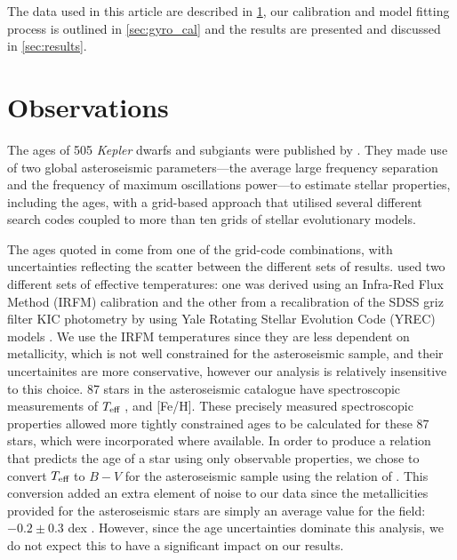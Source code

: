 \documentclass[11pt,preprint]{aastex}
\newcommand{\teff}{$T_{\rm{eff}}$}
\begin{document}
The data used in this article are described in \textsection \ref{sec:data},
our calibration and model fitting process is outlined in \textsection
\ref{sec:gyro_cal} and the results are presented and discussed in \textsection
\ref{sec:results}.

\section{Observations}
\label{sec:data}

The ages of 505 {\it Kepler} dwarfs and subgiants were published by
\citet{Chaplin2014}.
They made use of two global asteroseismic parameters---the average large
frequency separation and the frequency of maximum oscillations power---to
estimate stellar properties, including the ages, with a grid-based approach
that utilised several different search codes coupled to more than ten grids of
stellar evolutionary models.

The ages quoted in \citet{Chaplin2014} come from one of the grid-code
combinations, with uncertainties reflecting the scatter between the different
sets of results.
\citet{Chaplin2014} used two different sets of effective temperatures: one was
derived using an Infra-Red Flux Method (IRFM) calibration
\citep{Casagrande2010, SilvaAguirre2012} and the other from a recalibration of
the SDSS griz filter KIC photometry by \citet{Pinsonneault2012} using Yale
Rotating Stellar Evolution Code (YREC) models \citep{Demarque2004}.
We use the IRFM temperatures since they are less dependent on metallicity,
which is not well constrained for the asteroseismic sample, and their
uncertainites are more conservative, however our analysis is relatively
insensitive to this choice.
87 stars in the asteroseismic catalogue have spectroscopic measurements of
\teff$~$, and [Fe/H].
These precisely measured spectroscopic properties allowed more tightly
constrained ages to be calculated for these 87 stars, which were
incorporated where available.
In order to produce a relation that predicts the age of a star using only
observable properties, we chose to convert \teff$~$to $B-V$ for the
asteroseismic sample using the relation of \citet{Sekiguchi2000}.
This conversion added an extra element of noise to our data since the
metallicities provided for the asteroseismic stars are simply an average value
for the field: $-0.2\pm0.3$ dex \citep[see e.g.][]{Silva_Aguirre2011}.
However, since the age uncertainties dominate this analysis, we do not expect
this to have a significant impact on our results.
\end{document}
